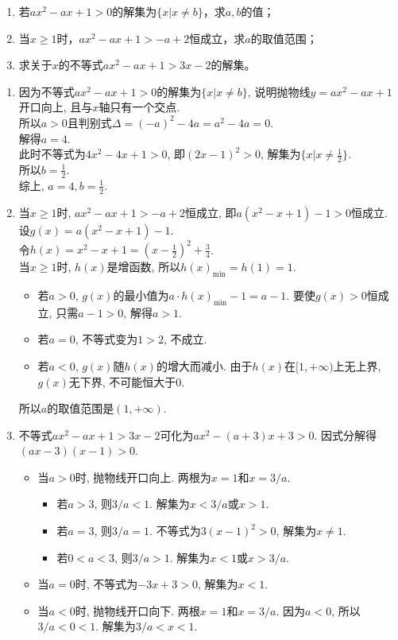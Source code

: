 \documentclass[CJKmath,a4paper,10pt]{ctexart}
\begin{document}
\begin{liti}
\begin{enumerate}
\item 若$ax^2-ax+1>0$的解集为$\{x|x \neq b\}$，求$a,b$的值；
\item 当$x\geq 1$时，$ax^2-ax+1>-a+2$恒成立，求$a$的取值范围；
\item 求关于$x$的不等式$ax^2-ax+1>3x-2$的解集。
\end{enumerate}
\tcblower

\begin{enumerate}
\item 因为不等式$ax^2-ax+1>0$的解集为$\{x|x \neq b\}$, 说明抛物线$y=ax^2-ax+1$开口向上, 且与$x$轴只有一个交点.\\
所以$a>0$且判别式$\Delta = (-a)^2 - 4a = a^2-4a=0$.\\
解得$a=4$.\\
此时不等式为$4x^2-4x+1>0$, 即$(2x-1)^2>0$, 解集为$\{x|x\neq \frac{1}{2}\}$.\\
所以$b=\frac{1}{2}$.\\
综上, $a=4, b=\frac{1}{2}$.

\item 当$x\geq 1$时, $ax^2-ax+1>-a+2$恒成立, 即$a(x^2-x+1)-1>0$恒成立.\\
设$g(x)=a(x^2-x+1)-1$.\\
令$h(x)=x^2-x+1=(x-\frac{1}{2})^2+\frac{3}{4}$.\\
当$x\ge 1$时, $h(x)$是增函数, 所以$h(x)_{\min}=h(1)=1$.\\
\begin{itemize}
    \item 若$a>0$, $g(x)$的最小值为$a \cdot h(x)_{\min}-1 = a-1$.
    要使$g(x)>0$恒成立, 只需$a-1>0$, 解得$a>1$.
    \item 若$a=0$, 不等式变为$1>2$, 不成立.
    \item 若$a<0$, $g(x)$随$h(x)$的增大而减小. 由于$h(x)$在$[1, +\infty)$上无上界, $g(x)$无下界, 不可能恒大于0.
\end{itemize}
所以$a$的取值范围是$(1, +\infty)$.

\item 不等式$ax^2-ax+1>3x-2$可化为$ax^2-(a+3)x+3>0$.
因式分解得$(ax-3)(x-1)>0$.
\begin{itemize}
    \item 当$a>0$时, 抛物线开口向上. 两根为$x=1$和$x=3/a$.
    \begin{itemize}
        \item 若$a>3$, 则$3/a < 1$. 解集为$x<3/a$或$x>1$.
        \item 若$a=3$, 则$3/a=1$. 不等式为$3(x-1)^2>0$, 解集为$x\neq 1$.
        \item 若$0<a<3$, 则$3/a > 1$. 解集为$x<1$或$x>3/a$.
    \end{itemize}
    \item 当$a=0$时, 不等式为$-3x+3>0$, 解集为$x<1$.
    \item 当$a<0$时, 抛物线开口向下. 两根$x=1$和$x=3/a$. 因为$a<0$, 所以$3/a<0<1$.
    解集为$3/a < x < 1$.
\end{itemize}
\end{enumerate}

\end{liti}
\end{document}
